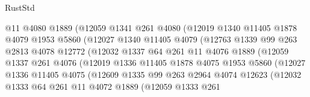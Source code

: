 \begin{lexlean}{RustStd}
\begin{coremodule}
{\begin{coremodule}
{{{{{{{{{{{{{{{{{{{{{{{{{{{{{                        @11
                        @4080
                        @1889
                        (@12059
                          @1341
                          @261
                          @4080
                          (@12019
                            @1340
                            @11405
                            @1878
                            @4079
                            @1953
                            @5860
                            (@12027
                              @1340
                              @11405
                              @4079
                              (@12763
                                @1339
                                @99
                                @263
                                @2813
                                @4078
                                @12772
                                (@12032
                                  @1337
                                  @64
                                  @261
                                  @11
                                  @4076
                                  @1889
                                  (@12059
                                    @1337
                                    @261
                                    @4076
                                    (@12019
                                      @1336
                                      @11405
                                      @1878
                                      @4075
                                      @1953
                                      @5860
                                      (@12027
                                        @1336
                                        @11405
                                        @4075
                                        (@12609
                                          @1335
                                          @99
                                          @263
                                          @2964
                                          @4074
                                          @12623
                                          (@12032
                                            @1333
                                            @64
                                            @261
                                            @11
                                            @4072
                                            @1889
                                            (@12059
                                              @1333
                                              @261
}}}}}}}}}}}}}}}}}}}}}}}}}}}}}
\end{coremodule}}
\end{coremodule}
\end{lexlean}
